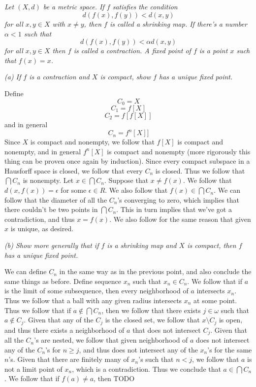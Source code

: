 \documentclass[11pt,oneside,titlepage]{book}
\begin{document}
\subsection{}

\textit{Let $(X, d)$ be a metric space. If $f$ satisfies the condition
  $$d(f(x), f(y)) < d(x, y)$$
  for all $x, y \in X$ with $x \neq y$, then $f$ is called a shrinking map. If there's a number
  $\alpha < 1$ such that
  $$d(f(x), f(y)) < \alpha d(x, y)$$
  for all $x, y \in X$ then $f$ is called a contraction. A fixed point of $f$ is a point $x$ such
  that $f(x) = x$. }

\textit{(a) If $f$ is a contraction and $X$ is compact, show $f$ has a unique fixed point.}

Define
$$C_0 = X$$
$$C_1 = f[X]$$
$$C_2 = f[f[X]]$$
and in general
$$C_n = f^n[X]]$$
Since $X$ is compact and nonempty, we follow that $f[X]$ is compact and
nonempty, and in general $f^n[X]$ is compact and nonempty
(more rigorously this thing can be proven once again by induction).
Since every compact subspace in a Hausforff space is closed, we follow that every $C_n$ is closed.
Thus we follow that $\bigcap{C_n}$ is nonempty. Let $x \in \bigcap{C_n}$. Suppose that $x \neq f(x)$.
We follow that $d(x, f(x)) = \epsilon$ for some $\epsilon \in R$. We also follow that
$f(x) \in \bigcap{C_n}$. We can follow that the diameter of all the $C_n$'s converging to zero,
which implies that there couldn't be two points in $\bigcap{C_n}$. This in turn implies that we've got
a contradiction, and thus $x = f(x)$. We also follow for the same reason that given $x$ is
unique, as desired.

\textit{(b) Show more generally that if $f$ is a shrinking map and $X$ is compact, then $f$
  has a unique fixed point.}

We can define $C_n$ in the same way as in the previous point, and also conclude the same
things as before. Define sequence $x_n$ such that $x_n \in C_n$. We follow that if $a$ is the
limit of some subsequence, then every neighborhood of $a$ intersects $x_n$. Thus we follow that
a ball with any given radius intersects $x_n$ at some point. Thus we follow that if
$a \notin \bigcap{C_n}$, then we follow that there exists $j \in \omega$ such that
$a \notin C_j$. Given that any of the $C_j$ is the closed set, we follow that $x \setminus C_j$
is open, and thus there exists a neighborhood of $a$ that does not intersect $C_j$. Given
that all the $C_n$'s are nested, we follow that given neighborhood of  $a$ does not intersect
any of the $C_n$'s for $n \geq j$, and thus does not intersect any of the $x_n$'s for the
same $n$'s. Given that there are finitely many of $x_n$'s such that $n < j$, we follow that
$a$ is not a limit point of $x_n$, which is a contradiction. Thus we conclude that
$a \in \bigcap{C_n}$. We follow that if $f(a) \neq a$, then TODO
\end{document}
